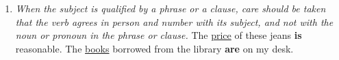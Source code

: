 \begin{enumerate}
{        The verb after ``Who", ``That", ``Which" agrees with noun to which the
        relative pronoun refer.
        }
        \newline
        \newline
        She is one of \underline{the cleverest girls} \textbf{that have}
        graduated from school.
        \newline
        \newline
        She is \underline{the only one} of my friends \textbf{that has} joined
        the police force.
    \item
        {\it
        When the subject is qualified by a phrase or a clause, care should be
        taken that the verb agrees in person and number with its subject, and
        not with the noun or pronoun in the phrase or clause.
        }
        \newline
        \newline
        The \underline{price} of these jeans \textbf{is} reasonable.
        \newline
        \newline
        The \underline{books} borrowed from the library \textbf{are} on my desk.
\end{enumerate}
